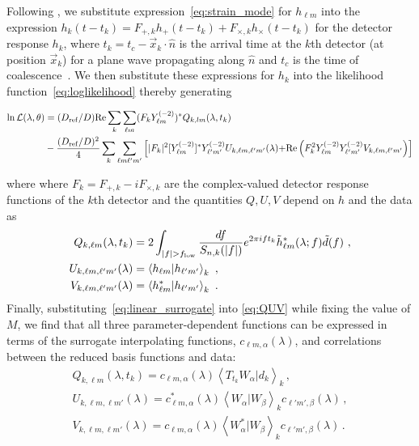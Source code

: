\documentclass[aps,prd,nofootinbib,showpacs,amssymb,twocolumn]{revtex4}
\newcommand\Y[1]{Y^{(#1)}}
\newcommand\qmstateproduct[2]{\left<#1|#2\right>}
\begin{document}
%
%
%
%
%
Following \citet{gwastro-PE-AlternativeArchitectures}, we substitute expression~\eqref{eq:strain_mode} 
for $h_{\ell m}$ into the expression $h_k(t-t_k) =F_{+,k} h_+(t-t_k) +
  F_{\times,k}h_\times(t-t_k)$ for the detector response $h_k$,
where $t_k=t_c - \vec{x}_k \cdot \hat{n}$ is the arrival time at the $k$th detector (at position $\vec{x}_k$)
for a plane wave propagating along $\hat{n}$ 
and $t_c$ is the time of coalescence~\cite{gwastro-PE-AlternativeArchitectures}.
We then substitute these expressions for $h_k$ into the likelihood function~\eqref{eq:loglikelihood}
thereby generating~\cite{gwastro-PE-AlternativeArchitectures}
\begin{widetext}
\begin{align}
\ln {\cal L}(\lambda, \theta) 
&= (D_{\rm ref}/D) \text{Re} \sum_k \sum_{\ell m}(F_k \Y{-2}_{\ell m})^* Q_{k,lm}(\lambda,t_k)\nonumber \\
&   -\frac{(D_{\rm ref}/D)^2}{4}\sum_k \sum_{\ell m \ell' m'}
\left[
{
|F_k|^2 [\Y{-2}_{\ell m}]^*\Y{-2}_{\ell'm'} U_{k,\ell m,\ell' m'}(\lambda)
}
%
 {
+  \text{Re} \left( F_k^2 \Y{-2}_{\ell m} \Y{-2}_{\ell'm'} V_{k,\ell m,\ell'm'} \right)
}
\right]
\label{eq:def:lnL:Decomposed}
\end{align}
\end{widetext}
%
%
where 
where $F_k = F_{+,k} - i F_{\times,k}$ are the
complex-valued detector
response functions of the $k$th detector \cite{gwastro-PE-AlternativeArchitectures} and
the quantities $Q,U,V$ depend on $h$ and the data as
\begin{subequations}
%
\label{eq:QUV}
\begin{align}
Q_{k,\ell m}(\lambda,t_k)
%
&= 2 \int_{|f|>f_{\rm low}} \frac{df}{S_{n,k}(|f|)} e^{2\pi i f t_k} \tilde{h}_{\ell m}^*(\lambda;f) \tilde{d}(f)\ , \\
{ U_{k,\ell m,\ell' m'}(\lambda)}& = \qmstateproduct{h_{\ell m}}{h_{\ell'm'}}_k\ , \\
V_{k,\ell m,\ell' m'}(\lambda)& = \qmstateproduct{h_{\ell m}^*}{h_{\ell'm'}}_k  \ .
\end{align}
\end{subequations}
Finally, substituting~\eqref{eq:linear_surrogate} into \eqref{eq:QUV}
while fixing the value of $M$,
%
we find that all three parameter-dependent functions can be expressed in terms of the
%
surrogate interpolating functions, $c_{\ell m,\alpha}(\lambda)$, and 
%
correlations between the reduced basis functions and data:
%
%
\begin{subequations}
\label{eq:QuantitiesViaSurrogate}
\begin{eqnarray}
Q_{k,\ell m}(\lambda,t_k) = c_{\ell m,\alpha}(\lambda) \qmstateproduct{T_{t_k} W_\alpha}{d_k}_k \,, \\
U_{k,\ell m,\ell m'}(\lambda) = c^*_{\ell m,\alpha}(\lambda)   \qmstateproduct{W_\alpha}{W_\beta}_k c_{\ell'm',\beta}(\lambda)  \,, \\
V_{k,\ell m,\ell m'}(\lambda) = c_{\ell m,\alpha}(\lambda)   \qmstateproduct{W^*_\alpha}{W_\beta}_k c_{\ell'm',\beta}(\lambda)  \,.
\end{eqnarray}
\end{subequations}
\end{document}
